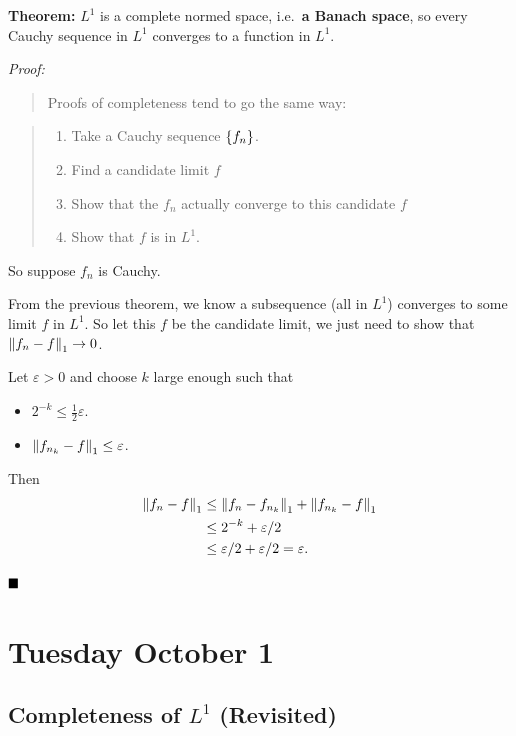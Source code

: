 \textbf{Theorem:} \(L^1\) is a complete normed space, i.e.~\textbf{a
Banach space}, so every Cauchy sequence in \(L^1\) converges to a
function in \(L^1\).

\emph{Proof:}

\begin{quote}
Proofs of completeness tend to go the same way:
\end{quote}

\begin{quote}
\begin{enumerate}
\def\labelenumi{\arabic{enumi}.}
\tightlist
\item
  Take a Cauchy sequence \(\left\{{f_n}\right\}\).
\item
  Find a candidate limit \(f\)
\item
  Show that the \(f_n\) actually converge to this candidate \(f\)
\item
  Show that \(f\) is in \(L^1\).
\end{enumerate}
\end{quote}

So suppose \(f_n\) is Cauchy.

From the previous theorem, we know a subsequence (all in \(L^1\))
converges to some limit \(f\) in \(L^1\). So let this \(f\) be the
candidate limit, we just need to show that \({\left\lVert {f_n - f} \right\rVert}_1 \to 0\).

Let \(\varepsilon > 0\) and choose \(k\) large enough such that

\begin{itemize}
\tightlist
\item
  \(2^{-k} \leq \frac 1 2 \varepsilon\).
\item
  \({\left\lVert {f_{n_k} - f} \right\rVert}_1 \leq \varepsilon\).
\end{itemize}

Then \begin{align*}
{\left\lVert {f_n - f} \right\rVert}_1 
&\leq {\left\lVert {f_n - f_{n_k}} \right\rVert}_1 + {\left\lVert {f_{n_k} - f} \right\rVert}_1 \\
&\leq 2^{-k} + \varepsilon/2 \\
&\leq \varepsilon/2 + \varepsilon/2 = \varepsilon
.\end{align*}

\(\qed\)

\hypertarget{tuesday-october-1}{%
\section{Tuesday October 1}\label{tuesday-october-1}}

\hypertarget{completeness-of-l1-revisited}{%
\subsection{\texorpdfstring{Completeness of \(L^1\)
(Revisited)}{Completeness of L\^{}1 (Revisited)}}\label{completeness-of-l1-revisited}}

